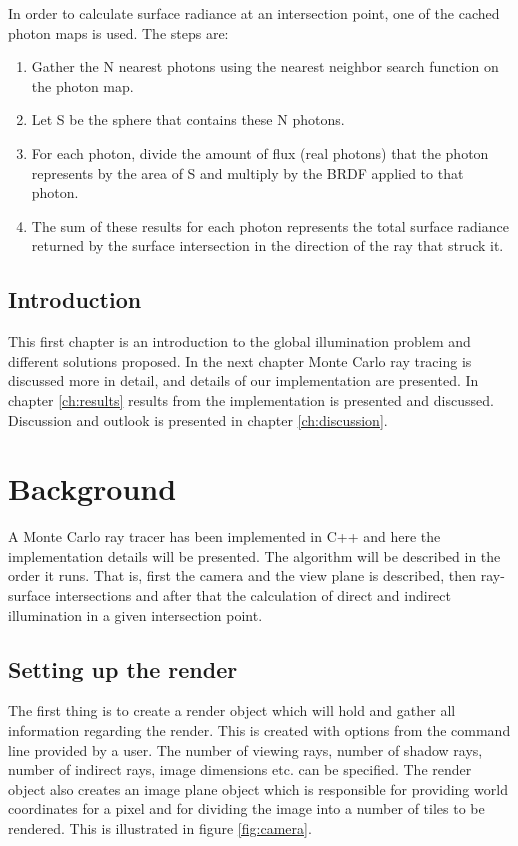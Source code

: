 \documentclass[a4paper]{report}
\begin{document}
In order to calculate surface radiance at an intersection point, one
of the cached photon maps is used. The steps are:

\begin{enumerate}
\item{Gather the N nearest photons using the nearest neighbor search function on the photon map.}
\item{Let S be the sphere that contains these N photons.}
\item {For each photon, divide the amount of flux (real photons) that
    the photon represents by the area of S and multiply by the BRDF applied to that photon.}
\item{The sum of these results for each photon represents the total
    surface radiance returned by the surface intersection in the
    direction of the ray that struck it.}
\end{enumerate}

\section{Introduction}
This first chapter is an introduction to the global illumination problem and different
solutions proposed. In the next chapter Monte Carlo ray tracing is
discussed more in detail, and details of our implementation are
presented. In chapter \ref{ch:results} results from the implementation
is presented and discussed. Discussion and outlook is presented in chapter \ref{ch:discussion}.

\chapter{Background}

A Monte Carlo ray tracer has been implemented in C++ and here the
implementation details will be presented. The algorithm will be
described in the order it runs. That is, first the camera and the view
plane is described, then ray-surface intersections and after that the
calculation of direct and indirect illumination in a given
intersection point.

\section{Setting up the render}

The first thing is to create a render object which will hold and
gather all information regarding the render. This is created with
options from the command line provided by a user. The number of
viewing rays, number of shadow rays, number of indirect rays, image
dimensions etc. can be specified. The render object also creates an
image plane object which is responsible for providing world
coordinates for a pixel and for dividing the image into a number of
tiles to be rendered. This is illustrated in figure
\ref{fig:camera}.
\end{document}
